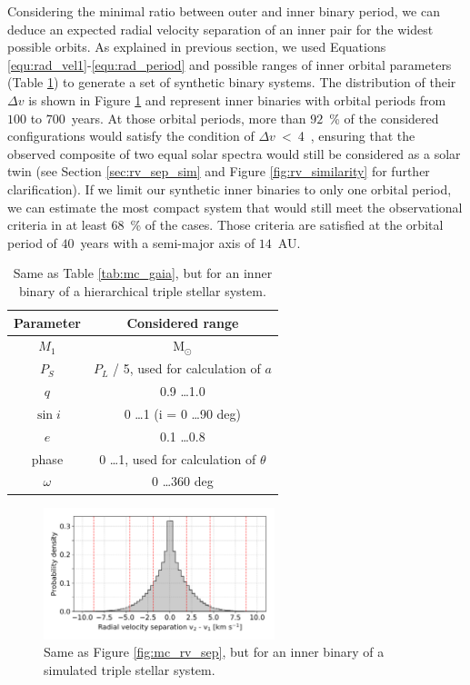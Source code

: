 Considering the minimal ratio between outer and inner binary period, we can deduce an expected radial velocity separation of an inner pair for the widest possible orbits. As explained in previous section, we used Equations \ref{equ:rad_vel1}-\ref{equ:rad_period} and possible ranges of inner orbital parameters (Table \ref{tab:mc_gaia_inner}) to generate a set of synthetic binary systems. The distribution of their $\Delta v$ is shown in Figure \ref{fig:mc_rv_sep_inner} and represent inner binaries with orbital periods from $100$ to $700$~years. At those orbital periods, more than $92$~\% of the considered configurations would satisfy the condition of $\Delta v$~<~4~\kms, ensuring that the observed composite of two equal solar spectra would still be considered as a solar twin (see Section \ref{sec:rv_sep_sim} and Figure \ref{fig:rv_similarity} for further clarification). If we limit our synthetic inner binaries to only one orbital period, we can estimate the most compact system that would still meet the observational criteria in at least $68$~\% of the cases. Those criteria are satisfied at the orbital period of $40$~years with a semi-major axis of $14$~AU. 

\begin{table}
	\centering
	\caption{Same as Table \ref{tab:mc_gaia}, but for an inner binary of a hierarchical triple stellar system.}
	\begin{tabular}{c c}
		\hline
		Parameter & Considered range \\ 
		\hline \hline
		$M_1$ & M$_{\odot}$ \\
		$P_S$ & $P_L$ / 5, used for calculation of $a$ \\
		$q$ & 0.9 \ldots 1.0 \\
		$\sin i$ & 0 \ldots 1 (i = 0 \ldots 90 deg)\\
		$e$ & 0.1 \ldots 0.8 \\
		phase & 0 \ldots 1, used for calculation of $\theta$ \\
		$\omega$ & 0 \ldots 360 deg \\
		\hline
	\end{tabular}
	\label{tab:mc_gaia_inner}
\end{table}

\begin{figure}
	\centering
	\includegraphics[width=0.6\textwidth]{MC_rv_from_sep_inner.png}
	\caption{Same as Figure \ref{fig:mc_rv_sep}, but for an inner binary of a simulated triple stellar system.}
	\label{fig:mc_rv_sep_inner}
\end{figure}

